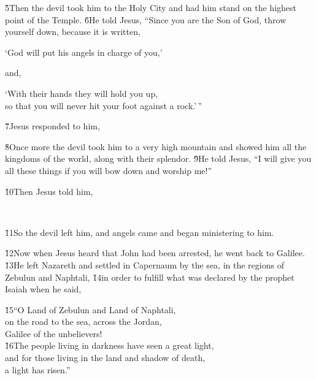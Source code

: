 \v{5}Then the devil took him to the Holy City and had him stand on the highest point of the Temple. \v{6}He told Jesus, ``Since you are the Son of God, throw yourself down, because it is written,

\begin{poetry}
\poeml `God will put his angels in charge of you,'
\end{poetry}

and,

\begin{poetry}
\poeml `With their hands they will hold you up, \\
\poemll    so that you will never hit your foot against a rock.'\,''
\end{poetry}

\v{7}Jesus responded to him, 

\v{8}Once more the devil took him to a very high mountain and showed him all the kingdoms of the world, along with their splendor. \v{9}He told Jesus, ``I will give you all these things if you will bow down and worship me!''

\v{10}Then Jesus told him, 

\begin{poetry}
\poeml {} \\
\poemll    {}
\end{poetry}

\v{11}So the devil left him, and angels came and began ministering to him.

\v{12}Now when Jesus heard that John had been arrested, he went back to Galilee. \v{13}He left Nazareth and settled in Capernaum by the sea, in the regions of Zebulun and Naphtali, \v{14}in order to fulfill what was declared by the prophet Isaiah when he said,

\begin{poetry}
\poeml \v{15}``O Land of Zebulun and Land of Naphtali, \\
\poemll    on the road to the sea, across the Jordan, \\
\poemlll       Galilee of the unbelievers! \\
\poeml \v{16}The people living in darkness have seen a great light, \\
\poemll    and for those living in the land and shadow of death, \\
\poemlll       a light has risen.''
\end{poetry}

